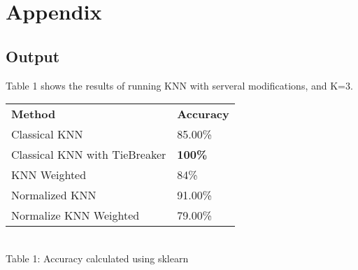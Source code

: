 \documentclass{article}
\begin{document}
 
 \section{Appendix}

 \subsection{Output}
 
 
 Table 1 shows the results of running  KNN with serveral modifications, and K=3.   \\


\begin{tabular}{ll}
\\
\textbf{Method}                    & \textbf{Accuracy}  \\
Classical KNN                      & 85.00\%                    \\
Classical KNN with TieBreaker & \textbf{100\%}                      \\
KNN Weighted                       & 84\%                       \\
Normalized KNN                     & 91.00\%                    \\
Normalize KNN Weighted             & 79.00\%                   
\end{tabular}
\\
Table 1: Accuracy calculated using sklearn
  
\end{document}
